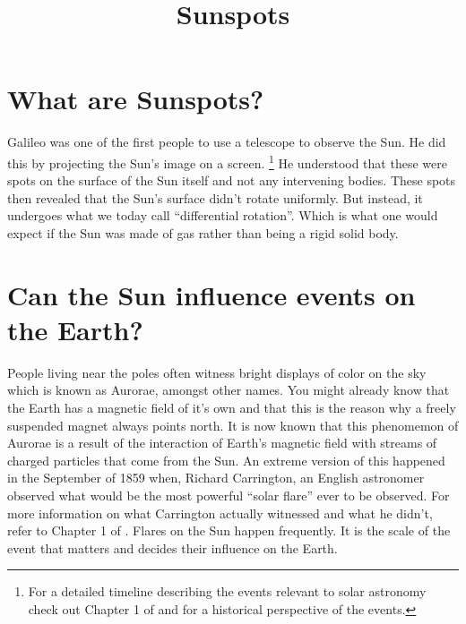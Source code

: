 \documentclass{../template/texnote}
\title{Sunspots}
\begin{document}
    \maketitle {}
\section{What are Sunspots?}%
Galileo was one of the first people to use a telescope to observe the Sun.
He did this by projecting the Sun's image on a screen.
\footnote{
    For a detailed timeline describing the events relevant to solar astronomy check out Chapter 1 of  and  for a historical perspective of the events.
}
He understood that these were spots on the surface of the Sun itself and not any intervening bodies.
These spots then revealed that the Sun's surface didn't rotate uniformly.
But instead, it undergoes what we today call ``differential rotation''.
Which is what one would expect if the Sun was made of gas rather than being a rigid solid body.

\section{Can the Sun influence events on the Earth?}%
People living near the poles often witness bright displays of color on the sky which is known as Aurorae, amongst other names.
You might already know that the Earth has a magnetic field of it's own and that this is the reason why a freely suspended magnet always points north.
It is now known that this phenomemon of Aurorae is a result of the interaction of Earth's magnetic field with streams of charged particles that come from the Sun.
An extreme version of this happened in the September of 1859 when, Richard Carrington, an English astronomer observed what would be the most powerful ``solar flare'' ever to be observed.
For more information on what Carrington actually witnessed and  what he didn't, refer to Chapter 1 of .
Flares on the Sun happen frequently. It is the scale of the event that matters and decides their influence on the Earth.
\end{document}
